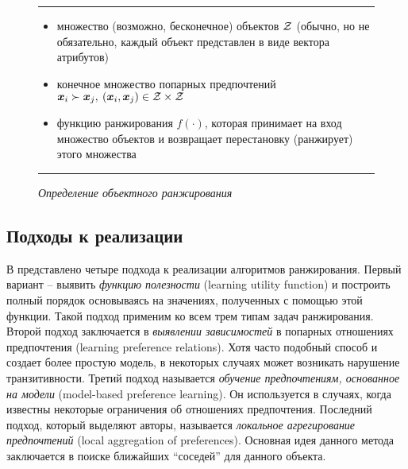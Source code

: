 		\begin{figure}[h]
			\hrule
			\begin{description}[nosep]
				\item[Дано:] \null\leavevmode
				\begin{itemize}[itemsep=0pt,leftmargin=2ex,label=\textbf{---}]
					\item множество (возможно, бесконечное) объектов $\mathcal{Z}$ (обычно, но не обязательно, каждый объект представлен в виде вектора атрибутов)
					\item конечное множество попарных предпочтений $\bm{x}_i \succ \bm{x}_j, \: (\bm{x}_i, \bm{x}_j) \in \mathcal{Z} \times \mathcal{Z}$
				\end{itemize}
				\item[Найти:] \null\leavevmode
				\begin{itemize}[itemsep=0pt,leftmargin=2ex,label=\textbf{---}]
					\item функцию ранжирования $f(\cdot)$, которая принимает на вход множество объектов и возвращает перестановку (ранжирует) этого множества
				\end{itemize}
			\end{description} 
			\hrule
			\caption{\it Определение объектного ранжирования \cite[Рис.~3]{plbook:Introduction:2010}}
			\label{fig:object_ranking}
		\end{figure}
	
	\subsection{Подходы к реализации}
		В \cite{plbook:Introduction:2010} представлено четыре подхода к реализации алгоритмов ранжирования. 
		Первый вариант – выявить \emph{функцию полезности} (learning utility function) и построить полный порядок основываясь на значениях, полученных с помощью этой функции. Такой подход применим ко всем трем типам задач ранжирования. 
		Второй подход заключается в \emph{выявлении зависимостей} в попарных отношениях предпочтения (learning preference relations). Хотя часто подобный способ и создает более простую модель, в некоторых случаях может возникать нарушение транзитивности\cite[с.~10]{plbook:Introduction:2010}. 
		Третий подход называется \emph{обучение предпочтениям, основанное на модели} (model-based preference learning). Он используется в случаях, когда известны некоторые ограничения об отношениях предпочтения. 
		Последний подход, который выделяют авторы, называется \emph{локальное агрегирование предпочтений} (local aggregation of preferences). Основная идея данного метода заключается в поиске ближайших \enquote{соседей} для данного объекта.
		
